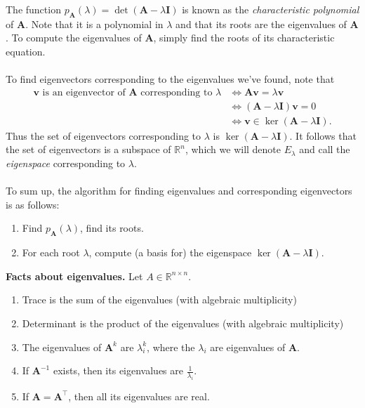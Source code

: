 \documentclass{article}
\begin{document}
The function $p_{\mathbf{A}}(\lambda) = \det(\mathbf{A} - \lambda \mathbf{I})$ is known as the \textit{characteristic polynomial} of $\mathbf{A}$. Note that it is a polynomial in $\lambda$ and that its roots are the eigenvalues of $\mathbf{A}$. To compute the eigenvalues of $\mathbf{A}$, simply find the roots of its characteristic equation. 
\\ \\
To find eigenvectors corresponding to the eigenvalues we've found, note that
\begin{align*}
\textbf{v} \text{ is an eigenvector of } \mathbf{A} \text{ corresponding to } \lambda &\iff \mathbf{Av} = \lambda \textbf{v} \\
&\iff (\mathbf{A} - \lambda \mathbf{I})\textbf{v} = 0 \\
&\iff \textbf{v} \in \ker (\mathbf{A} - \lambda \mathbf{I}).
\end{align*}
Thus the set of eigenvectors corresponding to $\lambda$ is $\ker(\mathbf{A} - \lambda \mathbf{I})$. It follows that the set of eigenvectors is a subspace of $\mathbb{R}^n$, which we will denote $E_\lambda$ and call the \textit{eigenspace} corresponding to $\lambda$. 
\\ \\
To sum up, the algorithm for finding eigenvalues and corresponding eigenvectors is as follows:
\begin{enumerate}
\item Find $p_{\mathbf{A}}(\lambda)$, find its roots. 
\item For each root $\lambda$, compute (a basis for) the eigenspace $\ker(\mathbf{A}-\lambda \mathbf{I})$. 
\end{enumerate}
\textbf{Facts about eigenvalues.} Let $A \in \mathbb{R}^{n \times n}$.
\begin{enumerate}[label=(\alph*)]
\item Trace is the sum of the eigenvalues (with algebraic multiplicity)
\item Determinant is the product of the eigenvalues (with algebraic multiplicity)
\item The eigenvalues of $\mathbf{A}^k$ are $\lambda_i^k$, where the $\lambda_i$ are eigenvalues of $\mathbf{A}$.
\item If $\mathbf{A}^{-1}$ exists, then its eigenvalues are $\frac{1}{\lambda_i}$.
\item If $\mathbf{A} = \mathbf{A}^\top$, then all its eigenvalues are real.
\end{enumerate}
\end{document}
